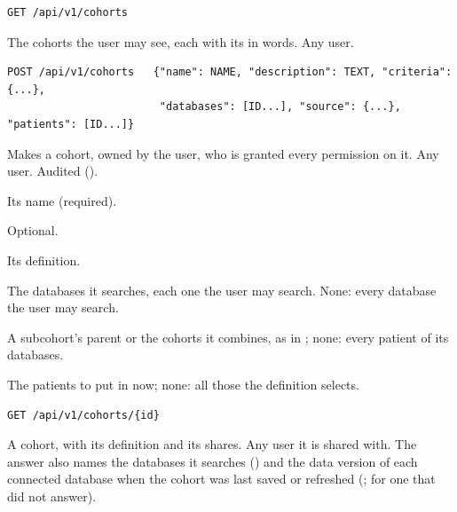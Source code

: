 \begin{lstlisting}[style=signature]
GET /api/v1/cohorts
\end{lstlisting}
The cohorts the user may see, each with its  in words. Any user.

\begin{lstlisting}[style=signature]
POST /api/v1/cohorts   {"name": NAME, "description": TEXT, "criteria": {...},
                        "databases": [ID...], "source": {...}, "patients": [ID...]}
\end{lstlisting}
Makes a cohort, owned by the user, who is granted every permission on it. Any user. Audited
().
\begin{params}
\item[name] Its name (required).
\item[description] Optional.
\item[criteria] Its definition.
\item[databases] The databases it searches, each one the user may search. None: every database
  the user may search.
\item[source] A subcohort's parent or the cohorts it combines, as in ;
  none: every patient of its databases.
\item[patients] The patients to put in now; none: all those the definition selects.
\end{params}

\begin{lstlisting}[style=signature]
GET /api/v1/cohorts/{id}
\end{lstlisting}
A cohort, with its definition and its shares. Any user it is shared with.
The answer also names the databases it searches () and the data version of each
connected database when the cohort was last saved or refreshed (;
 for one that did not answer).

